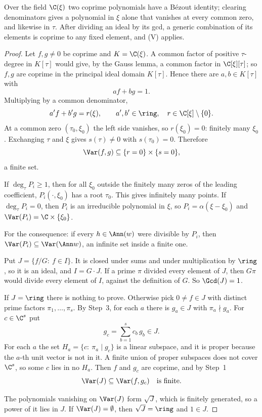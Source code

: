 \begin{proofidea}
Over the field $\C(\xi)$ two coprime polynomials have a B\'ezout identity; clearing denominators gives a polynomial in $\xi$ alone that vanishes at every common zero, and likewise in $\tau$. After dividing an ideal by its gcd, a generic combination of its elements is coprime to any fixed element, and (V) applies.
\end{proofidea}

\begin{proof}
Let $f,g\ne0$ be coprime and $K=\C(\xi)$. A common factor of positive $\tau$-degree in $K[\tau]$ would give, by the Gauss lemma, a common factor in $\C[\xi][\tau]$; so $f,g$ are coprime in the principal ideal domain $K[\tau]$. Hence there are $a,b\in K[\tau]$ with
\[
af+bg=1 .
\]
Multiplying by a common denominator,
\[
a'f+b'g=r(\xi),\qquad a',b'\in\ring,\quad r\in\C[\xi]\setminus\{0\}.
\]
At a common zero $(\tau_0,\xi_0)$ the left side vanishes, so $r(\xi_0)=0$: finitely many $\xi_0$. Exchanging $\tau$ and $\xi$ gives $s(\tau)\ne0$ with $s(\tau_0)=0$. Therefore
\[
\Var(f,g)\subseteq\{r=0\}\times\{s=0\},
\]
a finite set.

If $\deg_\tau P_i\ge1$, then for all $\xi_0$ outside the finitely many zeros of the leading coefficient, $P_i(\cdot,\xi_0)$ has a root $\tau_0$. This gives infinitely many points. If $\deg_\tau P_i=0$, then $P_i$ is an irreducible polynomial in $\xi$, so $P_i=\alpha(\xi-\xi_0)$ and $\Var(P_i)=\C\times\{\xi_0\}$.

For the consequence: if every $h\in\Ann(w)$ were divisible by $P_i$, then $\Var(P_i)\subseteq\Var(\Ann w)$, an infinite set inside a finite one.

Put $J=\{f/G:\ f\in I\}$. It is closed under sums and under multiplication by $\ring$, so it is an ideal, and $I=G\cdot J$. If a prime $\pi$ divided every element of $J$, then $G\pi$ would divide every element of $I$, against the definition of $G$. So $\Gcd(J)=1$.

If $J=\ring$ there is nothing to prove. Otherwise pick $0\ne f\in J$ with distinct prime factors $\pi_1,\dots,\pi_s$. By Step~3, for each $a$ there is $g_a\in J$ with $\pi_a\nmid g_a$. For $c\in\C^s$ put
\[
g_c=\sum_{b=1}^sc_b\,g_b\in J .
\]
For each $a$ the set $H_a=\{c:\ \pi_a\mid g_c\}$ is a linear subspace, and it is proper because the $a$-th unit vector is not in it. A finite union of proper subspaces does not cover $\C^s$, so some $c$ lies in no $H_a$. Then $f$ and $g_c$ are coprime, and by Step~1
\[
\Var(J)\subseteq\Var(f,g_c)\quad\text{is finite.}
\]

The polynomials vanishing on $\Var(J)$ form $\sqrt J$, which is finitely generated, so a power of it lies in $J$. If $\Var(J)=\emptyset$, then $\sqrt J=\ring$ and $1\in J$.

\end{proof}
